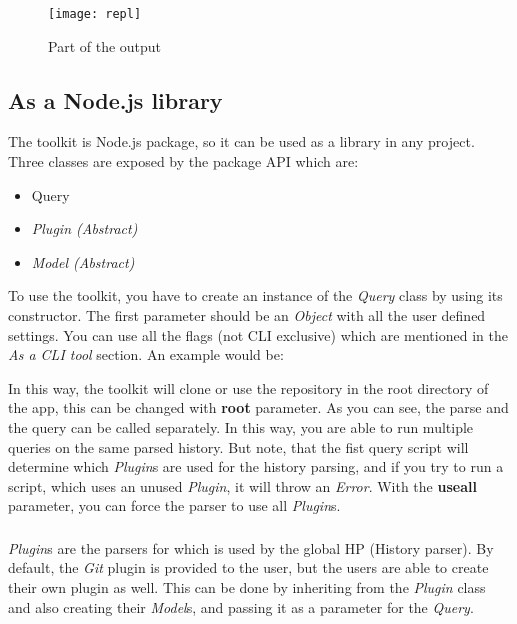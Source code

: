 \begin{figure}[H]
	\centering
	\texttt{[image: repl]}
	\caption{Part of the output}
	\label{fig:fig-query-repl}
\end{figure}

\subsection{As a Node.js library}

The toolkit is Node.js package, so it can be used as a library in any project.
Three classes are exposed by the package API which are:

\begin{itemize}
	\item Query
	\item \textit{Plugin (Abstract)}
	\item \textit{Model (Abstract)}
\end{itemize}

To use the toolkit, you have to create an instance of the \textit{Query} class by using its constructor.
The first parameter should be an \textit{Object} with all the user defined settings. 
You can use all the flags (not CLI exclusive) which are mentioned in the \textit{As a CLI tool} section.
An example would be:



In this way, the toolkit will clone or use the repository in the root directory of the app, this can be changed with \textbf{root} parameter.
As you can see, the parse and the query can be called separately. In this way, you are able to run multiple queries on the same parsed history.
But note, that the fist query script will determine which \textit{Plugin}s are used for the history parsing, and if you try to run a script, which
uses an unused \textit{Plugin}, it will throw an \textit{Error}. With the \textbf{useall} parameter, you can force the parser to use all \textit{Plugin}s.

\subsubsection{\label{Extending with plugins}}

\textit{Plugin}s are the parsers for which is used by the global HP (History parser). 
By default, the \textit{Git} plugin is provided to the user, but the users are able to create their own plugin as well.
\newline
This can be done by inheriting from the \textit{Plugin} class and also creating their \textit{Model}s, and passing it as a parameter for the \textit{Query}.

